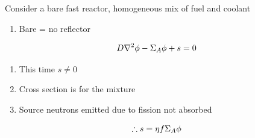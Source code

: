 \documentclass[aspectratio=1610,pdftex,dvipsnames,compress,xcolor={dvipsnames}]{beamer}
\begin{document}
\addtocounter{framenumber}{-2} 
\begin{frame}{Consider a bare fast reactor, homogeneous mix of fuel and coolant}
    \begin{enumerate}[series=outerlist,topsep=0pt,itemsep=21pt,leftmargin=*,label=(\arabic*)]
        \item[]Bare = no reflector
    \end{enumerate}

    \vspace*{\fill}

    \begin{equation}
        \LARGE
        D \nabla^2 \phi - \Sigma_A \phi + s = 0
    \end{equation}

    \vspace*{\fill}

    \begin{enumerate}[series=outerlist,topsep=0pt,itemsep=21pt,leftmargin=*,label=(\arabic*)]
        \item[]This time $s \neq 0$
        \item[]Cross section is for the mixture
        \item[]Source neutrons emitted due to fission not absorbed
    \end{enumerate}

    \vspace*{\fill}

    \begin{equation}
        \LARGE
        \therefore s = \eta f \Sigma_A \phi
    \end{equation}
\end{frame}
\end{document}
